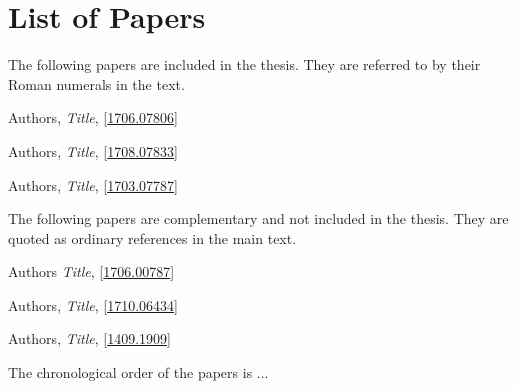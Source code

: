 
\chapter*{List of Papers}

\noindent The following papers are included in the thesis. They are
referred to by their Roman numerals in the text.

\begin{description}[labelindent=2mm,labelwidth=10mm,leftmargin=12mm,labelsep=0mm]

\item [{\ref{art:A}}] 
Authors,
\emph{Title},
{[}\href{https://arxiv.org/abs/1706.07806}{1706.07806}{]}

\item [{\ref{art:B}}]
Authors,
\emph{Title},
{[}\href{https://arxiv.org/abs/1708.07833}{1708.07833}{]}

\item [{\ref{art:C}}] 
Authors,
\emph{Title},
{[}\href{https://arxiv.org/abs/1703.07787}{1703.07787}{]}

\end{description}
\vspace{2ex}

\noindent The following papers are complementary and not included
in the thesis. They are quoted as ordinary references in the main
text.

\begin{description}[labelindent=2mm,labelwidth=10mm,leftmargin=12mm,labelsep=0mm]

\item [{IV}]
Authors 
\emph{Title}, 
{[}\href{https://arxiv.org/abs/1706.00787}{1706.00787}{]}

\item [{V}]
Authors,
\emph{Title},
{[}\href{https://arxiv.org/abs/1710.06434}{1710.06434}{]}

\item [{VI}] 
Authors,
\emph{Title},
{[}\href{https://arxiv.org/abs/1409.1909}{1409.1909}{]}

\end{description}
\vspace{2ex}

\noindent The chronological order of the papers is ...

